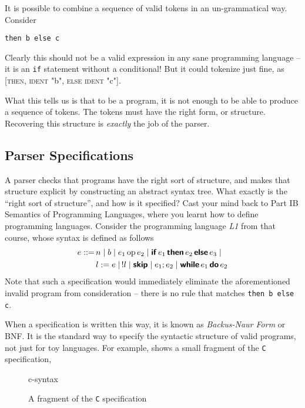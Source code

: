 It is possible to combine a sequence of valid tokens in an un-grammatical way. Consider
\begin{verbatim}
then b else c
\end{verbatim}
Clearly this should not be a valid expression in any sane programming language -- it is an \texttt{if} statement without a conditional! But it could tokenize just fine, as [\textsc{then}, \textsc{ident} "b", \textsc{else} \textsc{ident} "c"].

What this tells us is that to be a program, it is not enough to be able to produce a sequence of tokens. The tokens must have the right form, or structure. Recovering this structure is \textit{exactly} the job of the parser.

\subsection{Parser Specifications}\label{section:parser-generators}
A parser checks that programs have the right sort of structure, and makes that structure explicit by constructing an abstract syntax tree. What exactly is the ``right sort of structure'', and how is it specified? Cast your mind back to \textsf{Part IB Semantics of Programming Languages}, where you learnt how to define programming languages. Consider the programming language \textit{L1} from that course, whose syntax is defined as follows
\begin{align*}
    e ::= & \, n \mid b \mid e_1 \, \text{op} \, e_2 \mid \textbf{\textsf{if}} \, e_1 \, \textbf{\textsf{then}} \, e_2 \, \textbf{\textsf{else}} \, e_3 \mid \\
    & \, l := e \mid \, !l \mid \textbf{\textsf{skip}} \mid e_1 ; e_2 \mid \textbf{\textsf{while}} \, e_1 \, \textbf{\textsf{do}} \, e_2
\end{align*}
Note that such a specification would immediately eliminate the aforementioned invalid program from consideration -- there is no rule that matches \texttt{then b else c}.

When a specification is written this way, it is known as \textit{Backus-Naur Form} or BNF. It is the standard way to specify the syntactic structure of valid programs, not just for toy languages. For example,  shows a small fragment of the \texttt{C} specification,

\begin{figure}[H]
    \centering
    {c-syntax}
    \caption{A fragment of the \texttt{C} specification}
    \label{figures:c-syntax}
\end{figure}

